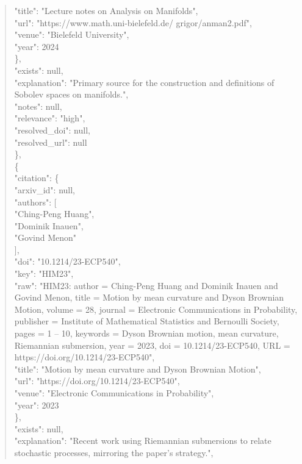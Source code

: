 \documentclass[11pt]{article}
\begin{document}
\begin{quote}
        "title": "Lecture notes on Analysis on Manifolds",\\
        "url": "https://www.math.uni-bielefeld.de/ grigor/anman2.pdf",\\
        "venue": "Bielefeld University",\\
        "year": 2024\\
      \},\\
      "exists": null,\\
      "explanation": "Primary source for the construction and definitions of Sobolev spaces on manifolds.",\\
      "notes": null,\\
      "relevance": "high",\\
      "resolved\_doi": null,\\
      "resolved\_url": null\\
    \},\\
    \{\\
      "citation": \{\\
        "arxiv\_id": null,\\
        "authors": [\\
          "Ching-Peng Huang",\\
          "Dominik Inauen",\\
          "Govind Menon"\\
        ],\\
        "doi": "10.1214/23-ECP540",\\
        "key": "HIM23",\\
        "raw": "HIM23: author = Ching-Peng Huang and Dominik Inauen and Govind Menon, title = Motion by mean curvature and Dyson Brownian Motion, volume = 28, journal = Electronic Communications in Probability, publisher = Institute of Mathematical Statistics and Bernoulli Society, pages = 1 -- 10, keywords = Dyson Brownian motion, mean curvature, Riemannian submersion, year = 2023, doi = 10.1214/23-ECP540, URL = https://doi.org/10.1214/23-ECP540",\\
        "title": "Motion by mean curvature and Dyson Brownian Motion",\\
        "url": "https://doi.org/10.1214/23-ECP540",\\
        "venue": "Electronic Communications in Probability",\\
        "year": 2023\\
      \},\\
      "exists": null,\\
      "explanation": "Recent work using Riemannian submersions to relate stochastic processes, mirroring the paper's strategy.",\\

\end{quote}
\end{document}
